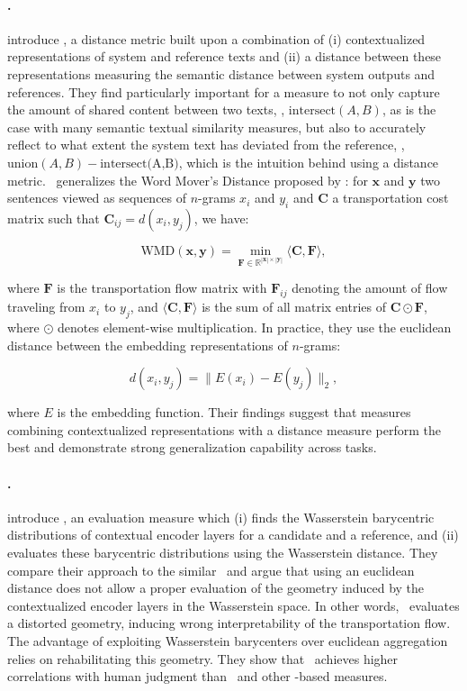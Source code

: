 \paragraph{\mover.}
\citet{zhao2019moverscore} introduce \mover, a distance metric built upon a combination of (i) contextualized representations of system and reference texts and (ii) a distance between these representations measuring the semantic distance between system outputs and references. They find particularly important for a measure to not only capture the amount of shared content between two texts, \ie, $\textrm{intersect}(A,B)$, as is the case with many semantic textual similarity measures, but also to accurately reflect to what extent the system text has deviated from the reference, \ie, $\textrm{union}(A,B) - \textrm{intersect(A,B)}$, which is the intuition behind using a distance metric. \mover\ generalizes the Word Mover's Distance proposed by \citet{kusner2015wmd}: for $\mathbf{x}$ and $\mathbf{y}$ two sentences viewed as sequences of $n$-grams $x_i$ and $y_i$ and $\mathbf{C}$ a transportation cost matrix such that $\mathbf{C}_{ij} = d(x_i, y_j)$, we have:

\[ \textrm{WMD}(\mathbf{x}, \mathbf{y}) = \min_{\mathbf{F} \in \mathbb{R}^{|\mathbf{x}| \times |\mathbf{y}|}} \langle \mathbf{C}, \mathbf{F} \rangle , \]

where $\mathbf{F}$ is the transportation flow matrix with $\mathbf{F}_{ij}$ denoting the amount of flow traveling from $x_i$ to $y_j$, and $\langle \mathbf{C}, \mathbf{F} \rangle$ is the sum of all matrix entries of $\mathbf{C} \odot \mathbf{F}$, where $\odot$ denotes element-wise multiplication. In practice, they use the euclidean distance between the embedding representations of $n$-grams: 

\[ d(x_i, y_j) = \| E(x_i) - E(y_j) \|_2 , \]

where $E$ is the embedding function. Their findings suggest that measures combining contextualized representations with a distance measure perform the best and demonstrate strong generalization capability across tasks.

\paragraph{\bary.}
\citet{colombo2021automatic} introduce \bary, an evaluation measure which (i) finds the Wasserstein barycentric distributions of contextual encoder layers for a candidate and a reference, and (ii) evaluates these barycentric distributions using the Wasserstein distance. They compare their approach to the similar \mover\ and argue that using an euclidean distance does not allow a proper evaluation of the geometry induced by the contextualized encoder layers in the Wasserstein space. In other words, \mover\ evaluates a distorted geometry, inducing wrong interpretability of the transportation flow. The advantage of exploiting Wasserstein barycenters over euclidean aggregation relies on rehabilitating this geometry. They show that \bary\ achieves higher correlations with human judgment than \mover\ and other \bert-based measures.

